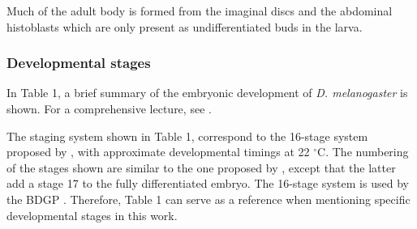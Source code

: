 Much of the adult body is formed
from the imaginal discs and the abdominal histoblasts which are only present
as undifferentiated buds in the larva.

\subsubsection{Developmental stages}

In Table 1, a brief summary of the embryonic development of \textit{D. melanogaster} is shown. For a comprehensive lecture, see \citep{Campos-Ortega1985,Roberts1998,Gilbert2014}.

The staging system shown in Table 1, correspond to the 16-stage system proposed by \citep{Roberts1998}, with approximate developmental timings at 22 $^\circ$C. 
The numbering of the stages shown are similar to the one proposed by \citet{Campos-Ortega1985}, except that the latter add a stage 17 to the fully differentiated embryo.
The 16-stage system is used by the BDGP \citep{Tomancak2002}. Therefore, Table 1 can serve as a reference when mentioning specific developmental stages in this work.




